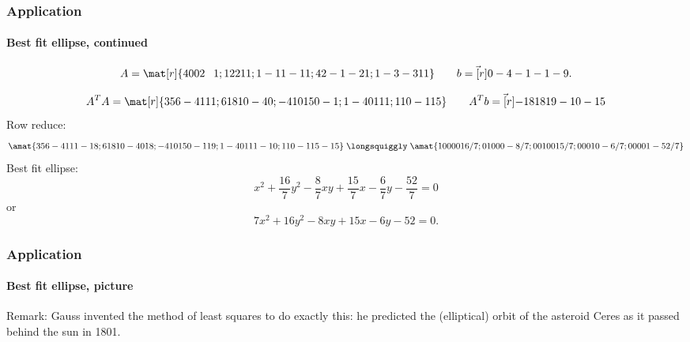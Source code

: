 \begin{frame}
\frametitle{Application}
\framesubtitle{Best fit ellipse, continued}

\small
\vskip-3mm
\[ A = \mat[r]{
  4 0 0 2 \phantom-1;
  1 2 2 1 1;
  1 -1 1 -1 1;
  4 2 -1 -2 1;
  1 -3 -3 1 1}
\qquad b = \vec[r]{0 -4 -1 -1 -9}. \]

\pause
\[ A^T A = \mat[r]{
  35 6 -4 1 11;
  6 18 10 -4 0;
  -4 10 15 0 -1;
  1 -4 0 11 1;
  11 0 -1 1 5
} \qquad
A^T b = \vec[r]{-18 18 19 -10 -15} \]
\pause
Row reduce:
\[ \amat{
  35 6 -4 1 11 -18;
  6 18 10 -4 0 18;
  -4 10 15 0 -1 19;
  1 -4 0 11 1 -10;
  11 0 -1 1 5 -15
}
\;\longsquiggly\;
\amat{
  1 0 0 0 0 16/7;
  0 1 0 0 0 -8/7;
  0 0 1 0 0 15/7;
  0 0 0 1 0 -6/7;
  0 0 0 0 1 -52/7
}
\]
\pause\normalsize
Best fit ellipse:
\displayskips{3pt}
\[ x^2 + \frac{16}7 y^2 -\frac87 xy + \frac{15}7x - \frac67y - \frac{52}7 = 0 \]
\pause
or
\[ 7 x^2 + 16 y^2 - 8 xy + 15 x - 6y - 52 = 0. \]

\end{frame}



\begin{frame}
\frametitle{Application}
\framesubtitle{Best fit ellipse, picture}

\begin{center}
\vskip-3mm
\end{center}

\pause[3]\vskip-1mm
\alert{Remark:} Gauss invented the method of least squares to do exactly this:
he predicted the (elliptical) orbit of the asteroid Ceres as it passed behind
the sun in 1801.
%

\end{frame}


